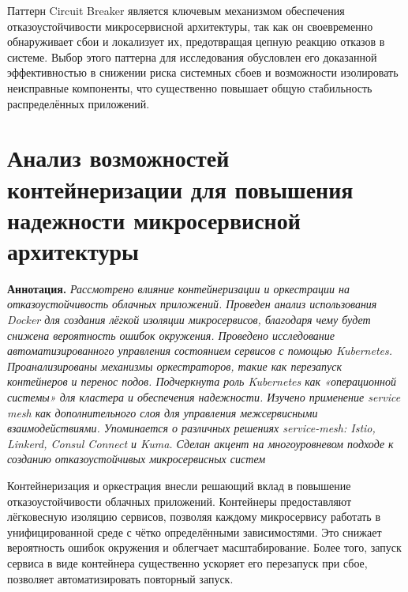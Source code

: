 Паттерн Circuit Breaker является ключевым механизмом обеспечения отказоустойчивости микросервисной архитектуры, так как он своевременно обнаруживает сбои и локализует их, предотвращая цепную реакцию отказов в системе. Выбор этого паттерна для исследования обусловлен его доказанной эффективностью в снижении риска системных сбоев и возможности изолировать неисправные компоненты, что существенно повышает общую стабильность распределённых приложений. 

\section{Анализ возможностей контейнеризации для повышения надежности микросервисной архитектуры}
\textbf{Аннотация. }\textit{Рассмотрено влияние контейнеризации и оркестрации на отказоустойчивость облачных приложений. Проведен анализ использования Docker для создания лёгкой изоляции микросервисов, благодаря чему будет снижена вероятность ошибок окружения. Проведено исследование автоматизированного управления состоянием сервисов с помощью Kubernetes. Проанализированы механизмы оркестраторов, такие как перезапуск контейнеров и перенос подов. Подчеркнута роль Kubernetes как «операционной системы» для кластера и обеспечения надежности. Изучено применение service mesh как дополнительного слоя для управления межсервисными взаимодействиями. Упоминается о различных решениях service-mesh: Istio, Linkerd, Consul Connect и Kuma. Сделан акцент на многоуровневом подходе к созданию отказоустойчивых микросервисных систем}

Контейнеризация и оркестрация внесли решающий вклад в повышение отказоустойчивости облачных приложений. Контейнеры предоставляют лёгковесную изоляцию сервисов, позволяя каждому микросервису работать в унифицированной среде с чётко определёнными зависимостями. Это снижает вероятность ошибок окружения и облегчает масштабирование. Более того, запуск сервиса в виде контейнера существенно ускоряет его перезапуск при сбое, позволяет автоматизировать повторный запуск.

